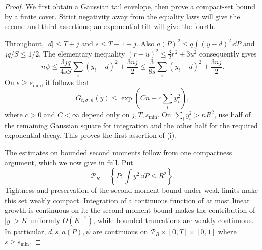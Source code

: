 \begin{proof}
We first obtain a Gaussian tail envelope, then prove a compact-set
bound by a finite cover. Strict negativity away from the equality laws
will give the second and third assertions; an exponential tilt will give
the fourth.

Throughout, $|d|\le T+j$ and $s\le T+1+j$. Also
$a(P)^2\le q\int(y-d)^2\,\dd P$ and $jq/S\le1/2$.  The elementary
inequality $(r-u)^2\le\frac32r^2+3u^2$ consequently gives
\[
 n\psi\le\frac{3jq}{4sS}\sum_i(y_i-d)^2+\frac{3nj}{2}
 \le\frac{3}{8s}\sum_i(y_i-d)^2+\frac{3nj}{2}.
\]
On $s\ge s_{\min}$, it follows that
\begin{equation}
 G_{t,\sigma,n}(y)\le
 \exp\left(Cn-c\sum_i y_i^2\right),
 \label{eq:scalar-tail-envelope}
\end{equation}
where $c>0$ and $C<\infty$ depend only on $j,T,s_{\min}$.
On $\sum_i y_i^2>nR^2$, use half of the remaining Gaussian square
for integration and the other half for the required exponential decay.
This proves the first assertion of \textup{(i)}.

The estimates on bounded second moments follow from one compactness
argument, which we now give in full. Put
\[
 \mathcal P_R=\left\{P:\int y^2\,\dd P\le R^2\right\}.
\]
Tightness and preservation of the second-moment bound under weak limits
make this set weakly compact. Integration of a continuous function of at
most linear growth is continuous on it: the second-moment bound makes
the contribution of $|y|>K$ uniformly $O(K^{-1})$, while bounded
truncations are weakly continuous. In particular, $d,s,a(P),\psi$ are
continuous on
$\mathcal P_R\times[0,T]\times[0,1]$ where $s\ge s_{\min}$.


\end{proof}
